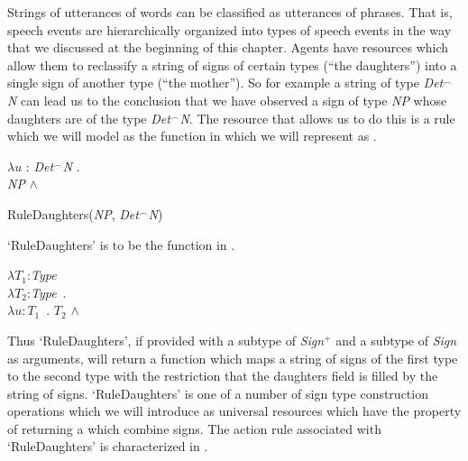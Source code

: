 Strings of utterances of words can be classified as utterances of
phrases.  That is, speech events are hierarchically organized into
types of speech events in the way that we discussed at the beginning
of this chapter.  Agents have resources which allow them to reclassify
a string of signs of certain types (``the daughters'') into a single
sign of another type (``the mother'').  So for example a string of
type \textit{Det}$^{\frown}$\textit{N} can lead us to the conclusion
that we have observed a sign of type \textit{NP} whose daughters are
of the type \textit{Det}$^{\frown}$\textit{N}.  The resource that
allows us to do this is a rule which we will
model as the function in  which we will represent as .
\begin{ex}
\begin{subex} 
\item $\lambda u$ : \textit{Det}$^{\frown}$\textit{N} . \\
\hspace*{1em}\textit{NP} \d{$\wedge$}

\item RuleDaughters(\textit{NP}, \textit{Det}$^{\frown}$\textit{N})
\end{subex}
\label{ex:NPDetNDaughters}
\end{ex}



`RuleDaughters' is to be the function in \nexteg{}.
\begin{ex} 
$\lambda T_1$:\textit{Type} \\
\hspace*{1em} $\lambda T_2$:\textit{Type}\ . \\
\hspace*{2em} $\lambda u\! :\! T_1$\ . $T_2$ \d{$\wedge$}  
\end{ex} 
Thus `RuleDaughters', if provided with a subtype of \textit{Sign}$^+$
and a subtype of \textit{Sign} as arguments, will return a function which 
maps a string of signs of the first type to the second type with the
restriction that the daughters field is filled by the string of
signs. `RuleDaughters' is one of a number of sign type construction
operations which we will introduce as universal resources which have
the property of returning a which combine signs.  The action rule
associated with `RuleDaughters' is characterized in
\nexteg{}.


